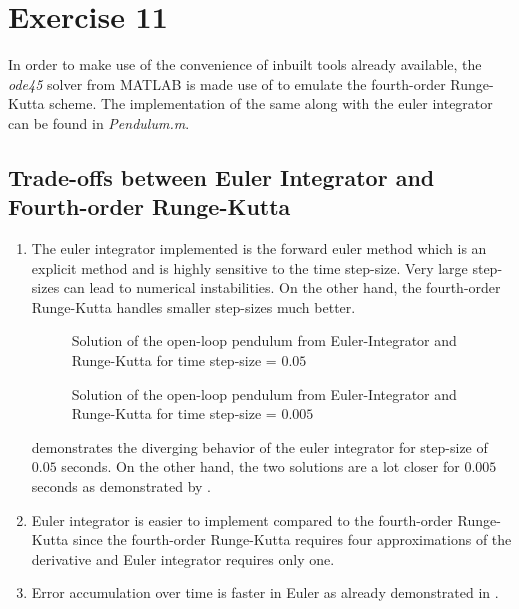 \section{Exercise 11}
In order to make use of the convenience of inbuilt tools already available, the \emph{ode45} solver from MATLAB\textsuperscript{\textregistered} is made use of to emulate the fourth-order Runge-Kutta scheme. The implementation of the same along with the euler integrator can be found in \emph{Pendulum.m}.
\subsection{Trade-offs between Euler Integrator and Fourth-order Runge-Kutta}
\begin{enumerate}
	\item The euler integrator implemented is the forward euler method which is an explicit method and is highly sensitive to the time step-size. Very large step-sizes can lead to numerical instabilities. On the other hand, the fourth-order Runge-Kutta handles smaller step-sizes much better.
	\begin{figure}[h!]
		\centering
		\scalebox{0.8}{}
		\caption{Solution of the open-loop pendulum from Euler-Integrator and Runge-Kutta for time step-size = $0.05$}
		\label{fig:eulerVsRK}
	\end{figure}

	\begin{figure}[h!]
		\centering
		\scalebox{0.8}{}
		\caption{Solution of the open-loop pendulum from Euler-Integrator and Runge-Kutta for time step-size = $0.005$}
		\label{fig:eulerVsRK_1}
	\end{figure}
	 demonstrates the diverging behavior of the euler integrator for step-size of $0.05$ seconds. On the other hand, the two solutions are a lot closer for $0.005$ seconds as demonstrated by .
	\item Euler integrator is easier to implement compared to the fourth-order Runge-Kutta since the fourth-order Runge-Kutta requires four approximations of the derivative and Euler integrator requires only one.
	\item Error accumulation over time is faster in Euler as already demonstrated in .
\end{enumerate}

